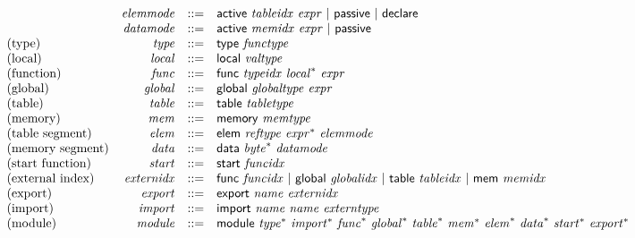 $$
\begin{array}{@{}lrrl@{}l@{}}
& {\mathit{elemmode}} &::=& \mathsf{active}~{\mathit{tableidx}}~{\mathit{expr}} ~|~ \mathsf{passive} ~|~ \mathsf{declare} \\
& {\mathit{datamode}} &::=& \mathsf{active}~{\mathit{memidx}}~{\mathit{expr}} ~|~ \mathsf{passive} \\
\mbox{(type)} & {\mathit{type}} &::=& \mathsf{type}~{\mathit{functype}} \\
\mbox{(local)} & {\mathit{local}} &::=& \mathsf{local}~{\mathit{valtype}} \\
\mbox{(function)} & {\mathit{func}} &::=& \mathsf{func}~{\mathit{typeidx}}~{{\mathit{local}}^\ast}~{\mathit{expr}} \\
\mbox{(global)} & {\mathit{global}} &::=& \mathsf{global}~{\mathit{globaltype}}~{\mathit{expr}} \\
\mbox{(table)} & {\mathit{table}} &::=& \mathsf{table}~{\mathit{tabletype}} \\
\mbox{(memory)} & {\mathit{mem}} &::=& \mathsf{memory}~{\mathit{memtype}} \\
\mbox{(table segment)} & {\mathit{elem}} &::=& \mathsf{elem}~{\mathit{reftype}}~{{\mathit{expr}}^\ast}~{\mathit{elemmode}} \\
\mbox{(memory segment)} & {\mathit{data}} &::=& \mathsf{data}~{{\mathit{byte}}^\ast}~{\mathit{datamode}} \\
\mbox{(start function)} & {\mathit{start}} &::=& \mathsf{start}~{\mathit{funcidx}} \\
\mbox{(external index)} & {\mathit{externidx}} &::=& \mathsf{func}~{\mathit{funcidx}} ~|~ \mathsf{global}~{\mathit{globalidx}} ~|~ \mathsf{table}~{\mathit{tableidx}} ~|~ \mathsf{mem}~{\mathit{memidx}} \\
\mbox{(export)} & {\mathit{export}} &::=& \mathsf{export}~{\mathit{name}}~{\mathit{externidx}} \\
\mbox{(import)} & {\mathit{import}} &::=& \mathsf{import}~{\mathit{name}}~{\mathit{name}}~{\mathit{externtype}} \\
\mbox{(module)} & {\mathit{module}} &::=& \mathsf{module}~{{\mathit{type}}^\ast}~{{\mathit{import}}^\ast}~{{\mathit{func}}^\ast}~{{\mathit{global}}^\ast}~{{\mathit{table}}^\ast}~{{\mathit{mem}}^\ast}~{{\mathit{elem}}^\ast}~{{\mathit{data}}^\ast}~{{\mathit{start}}^\ast}~{{\mathit{export}}^\ast} \\
\end{array}
$$

\vspace{1ex}

